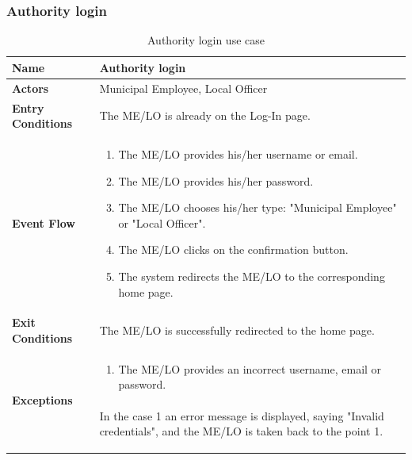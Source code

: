 					\subsubsection{Authority login}
					\begin{table}[!h]
						\centering
						\vspace{-4mm}
						\begin{tabular}{lp{}}
							\toprule
							\textbf{Name} & \textbf{Authority login} \\[1mm]
							\midrule
							\textbf{Actors} & Municipal Employee, Local Officer \\[1mm]
							\textbf{Entry Conditions} & The ME/LO is already on the Log-In page. \vspace{1mm}\\
							\textbf{Event Flow} &
							\vspace{-5mm} 
							\begin{enumerate}[noitemsep]
								\item The ME/LO provides his/her username or email.
								\item The ME/LO provides his/her password.
								\item The ME/LO chooses his/her type: "Municipal Employee" or "Local Officer".
								\item The ME/LO clicks on the confirmation button.
								\item The system redirects the ME/LO to the corresponding home page.
							\end{enumerate} \\
							\textbf{Exit Conditions} & The ME/LO is successfully redirected to the home page. \vspace{2mm}\\
							\textbf{Exceptions} &
							\vspace{-5mm} 
							\begin{enumerate}
								\item The ME/LO provides an incorrect username, email or password.
							\end{enumerate}
							\vspace{-7mm}
							\paragraph{}
								In the case 1 an error message is displayed, saying "Invalid credentials", and the ME/LO is taken back to the point 1. \\
							\bottomrule
						\end{tabular}
						\caption{Authority login use case}
					\end{table}
					\vspace{-4mm}
